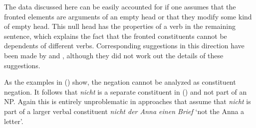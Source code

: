 The data discussed here can be easily accounted for if one assumes that the fronted elements are arguments of
an empty head or that they modify some kind of empty head. This null head has the properties of a verb in the
remaining sentence, which explains the fact that the fronted constituents cannot be dependents of different verbs.
Corresponding suggestions in this direction have been made by \citet{Fanselow93a} and \citet[]{Hoberg97a},
although they did not work out the details of these suggestions.

As the examples in () show, the negation cannot be analyzed as constituent negation. It
follows that \emph{nicht} is a separate constituent in () and not part of an NP. Again this is entirely
unproblematic in approaches that assume that \emph{nicht} is part of a larger verbal constituent
\emph{nicht der Anna einen Brief} `not the Anna a letter'.


